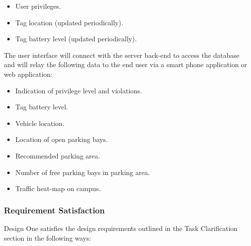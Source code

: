 \begin{itemize}
\item User privileges.
\item Tag location (updated periodically).
\item Tag battery level (updated periodically).
\end{itemize}

The user interface will connect with the server back-end to access the database and will relay the following data to the end user via a smart phone application or web application: 
\begin{itemize}
\item Indication of privilege level and violations.
\item Tag battery level.
\item Vehicle location.
\item Location of open parking bays.
\item Recommended parking area.
\item Number of free parking bays in parking area.
\item Traffic heat-map on campus.
\end{itemize}

\newpage
\subsubsection{Requirement Satisfaction\cite{assignment}}
Design One satisfies the design requirements outlined in the Task Clarification section in the following ways:

